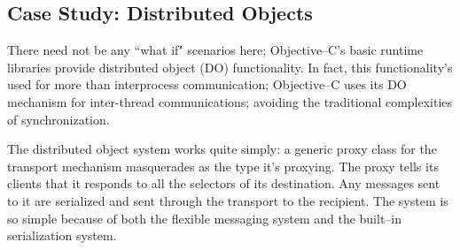 %
%
%
%
	\subsection{Case Study: Distributed Objects}
	There need not be any ``what if" scenarios here; Objective--C's basic runtime libraries provide distributed object (DO) functionality.  In fact, this functionality's used for more than interprocess communication; Objective--C uses its DO mechanism for inter-thread communications; avoiding the traditional complexities of synchronization.

	The distributed object system works quite simply: a generic proxy class for the transport mechanism masquerades as the type it's proxying.  The proxy tells its clients that it responds to all the selectors of its destination.  Any messages sent to it are serialized and sent through the transport to the recipient.  The system is so simple because of both the flexible messaging system and the built--in serialization system.

